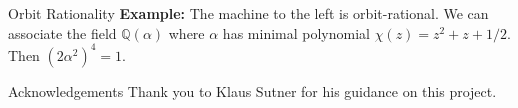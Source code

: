 \documentclass[a0]{a0poster}
\newcommand{\Q}{\mathbb Q}
\begin{document}
\begin{multicols}{2}
\begin{poster-section}{Orbit Rationality}
    \textbf{Example:} The machine to the left is orbit-rational. We can
    associate the field $\Q(\alpha)$ where $\alpha$ has minimal polynomial
    $\chi(z) = z^2 + z + 1/2$. Then $(2 \alpha^2)^4 = 1$.
\end{poster-section}
\begin{poster-section}{Acknowledgements}
    \Large
    Thank you to Klaus Sutner for his guidance on this project.
\end{poster-section}
\end{multicols}
\end{document}
